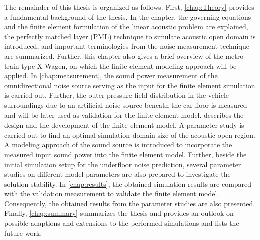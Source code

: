 The remainder of this thesis is organized as follows. First, \cref{chap:Theory} provides a fundamental background of the thesis. In the chapter, the governing equations and the finite element formulation of the linear acoustic problem are explained, the perfectly matched layer (PML) technique to simulate acoustic open domain is introduced, and important terminologies from the noise measurement technique are summarized. Further, this chapter also gives a brief overview of the metro train type X-Wagen, on which the finite element modeling approach will be applied. In \cref{chap:measurement}, the sound power measurement of the omnidirectional noise source serving as the input for the finite element simulation is carried out. Further, the outer pressure field distribution in the vehicle surroundings due to an artificial noise source beneath the car floor is measured and will be later used as validation for the finite element model.  describes the design and the development of the finite element model. A parameter study is carried out to find an optimal simulation domain size of the acoustic open region. A modeling approach of the sound source is introduced to incorporate the measured input sound power into the finite element model. Further, beside the initial simulation setup for the underfloor noise prediction, several parameter studies on different model parameters are also prepared to investigate the solution stability. In \cref{chap:results}, the obtained simulation results are compared with the validation measurement to validate the finite element model. Consequently, the obtained results from the parameter studies are also presented. Finally, \cref{chap:summary} summarizes the thesis and provides an outlook on possible adaptions and extensions to the performed simulations and lists the future work.
